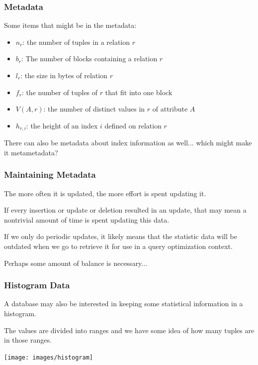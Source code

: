 \begin{frame}
\frametitle{Metadata}

Some items that might be in the metadata:

\begin{itemize}
	\item $n_{r}$: the number of tuples in a relation $r$ 
	\item $b_{r}$: The number of blocks containing a relation $r$ 
	\item $l_{r}$: the size in bytes of relation $r$
	\item $f_{r}$: the number of tuples of $r$ that fit into one block
	\item $V(A, r)$: the number of distinct values in $r$ of attribute $A$
	\item $h_{r, i}$: the height of an index $i$ defined on relation $r$
\end{itemize}

There can also be metadata about index information as well... which might make it metametadata?

\end{frame}



\begin{frame}
\frametitle{Maintaining Metadata}

The more often it is updated, the more effort is spent updating it. 

If every insertion or update or deletion resulted in an update, that may mean a nontrivial amount of time is spent updating this data. 

If we only do periodic updates, it likely means that the statistic data will be outdated when we go to retrieve it for use in a query optimization context. 

Perhaps some amount of balance is necessary...


\end{frame}

\begin{frame}
\frametitle{Histogram Data}

A database may also be interested in keeping some statistical information in a histogram. 

The values are divided into ranges and we have some idea of how many tuples are in those ranges. 

\begin{center}
\texttt{[image: images/histogram]}
\end{center}

\end{frame}

